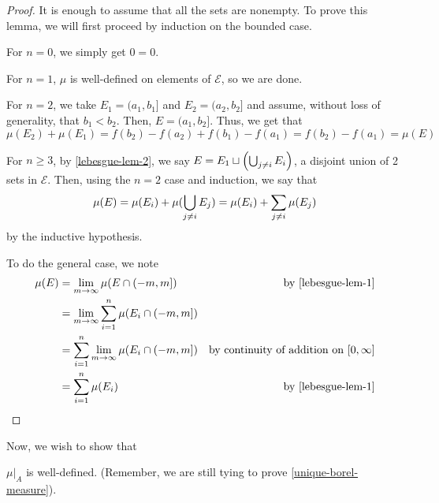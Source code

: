 \documentclass[11pt,leqno,oneside]{amsbook}
\numberwithin{thm}{section}
\newcommand{\Ep}{\mathcal{E}} %
\begin{document}
\begin{proof}
  It is enough to assume that all the sets are nonempty. To prove this
  lemma, we will first proceed by induction on the bounded case.

  For $n=0$, we simply get $0=0$.

  For $n=1$, $\mu$ is well-defined on elements of $\Ep$, so we are
  done.

  For $n=2$, we take $E_1 = (a_1,b_1]$ and $E_2 = (a_2,b_2]$ and
  assume, without loss of generality, that $b_1 < b_2$. Then, $E =
  (a_1,b_2]$. Thus, we get that \[
    \mu(E_2) + \mu(E_1) = f(b_2) - f(a_2) + f(b_1) - f(a_1) =
    f(b_2)-f(a_1) = \mu(E)
  \]

  For $n \geq 3$, by \ref{lebesgue-lem-2}, we say $E = E_1 \sqcup
  \left( \bigcup_{j \neq i} E_i \right)$, a disjoint union of 2 sets in
  $\Ep$. Then, using the $n=2$ case and induction, we say that \[
    \mu(E) = \mu(E_i) + \mu(\bigcup_{j \neq i} E_j) = \mu(E_i) +
    \sum_{j \neq i} \mu(E_j)
  \]
  by the inductive hypothesis.

  To do the general case, we note
  \begin{align*}
    \mu(E) & = \lim_{m \to \infty} \mu(E \cap (-m,m]) & \text{
                                                              by
                                                              \ref{lebesgue-lem-1}}
    \\
           & = \lim_{m \to \infty} \sum_{i=1}^n \mu(E_i \cap (-m,m]) \\
    & = \sum_{i=1}^n \lim_{m \to \infty} \mu(E_i \cap (-m,m]) &
                                                                      \text{by
                                                                      continuity
                                                                      of
                                                                      addition
                                                                      on
                                                                       }[0,\infty]
    \\
    & = \sum_{i=1}^n \mu(E_i) & \text{ by \ref{lebesgue-lem-1}}
  \end{align*}
\end{proof}
Now, we wish to show that
\begin{prop}
$\mu|_A$ is well-defined. (Remember, we are
still tying to prove \ref{unique-borel-measure}).
\end{prop}
\end{document}
